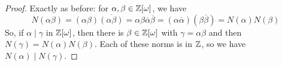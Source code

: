 \begin{proof}
    Exactly as before: for $\alpha,\beta \in \mathbb{Z}[\omega]$, we have
    \[ N(\alpha\beta) = (\alpha\beta)\overline{(\alpha\beta)} = \alpha\beta\overline{\alpha}\overline{\beta} = (\alpha\overline{\alpha})(\beta\overline{\beta}) = N(\alpha)N(\beta) \]
    So, if $\alpha \mid \gamma$ in $\mathbb{Z}[\omega]$, then there is $\beta \in \mathbb{Z}[\omega]$ with $\gamma = \alpha\beta$ and then $N(\gamma) = N(\alpha)N(\beta)$. Each of these norms is in $\mathbb{Z}$, so we have $N(\alpha) \mid N(\gamma)$.
\end{proof}